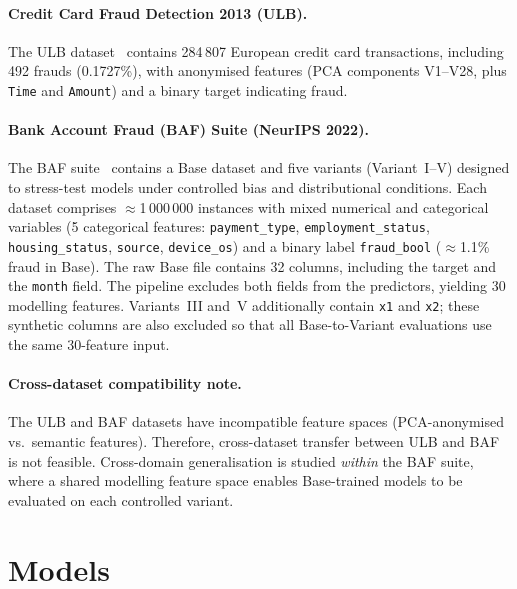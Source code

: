 \paragraph{Credit Card Fraud Detection 2013 (ULB).}
The ULB dataset~\cite{dalpozzolo2017realistic,ulb2013dataset} contains 284\,807 European credit card transactions, including 492 frauds (0.1727\%), with anonymised features (PCA components V1--V28, plus \texttt{Time} and \texttt{Amount}) and a binary target indicating fraud.

\paragraph{Bank Account Fraud (BAF) Suite (NeurIPS 2022).}
The BAF suite~\cite{jesus2022turning,feedzai2022bafdataset} contains a Base dataset and five variants (Variant~I--V) designed to stress-test models under controlled bias and distributional conditions. Each dataset comprises $\approx$1\,000\,000 instances with mixed numerical and categorical variables (5 categorical features: \texttt{payment\_type}, \texttt{employment\_status}, \texttt{housing\_status}, \texttt{source}, \texttt{device\_os}) and a binary label \texttt{fraud\_bool} ($\approx$1.1\% fraud in Base). The raw Base file contains 32 columns, including the target and the \texttt{month} field. The pipeline excludes both fields from the predictors, yielding 30 modelling features. Variants~III and~V additionally contain \texttt{x1} and \texttt{x2}; these synthetic columns are also excluded so that all Base-to-Variant evaluations use the same 30-feature input.

\paragraph{Cross-dataset compatibility note.}
The ULB and BAF datasets have incompatible feature spaces (PCA-anonymised vs.\ semantic features). Therefore, cross-dataset transfer between ULB and BAF is not feasible. Cross-domain generalisation is studied \emph{within} the BAF suite, where a shared modelling feature space enables Base-trained models to be evaluated on each controlled variant.

\section{Models}
\label{sec:models}

